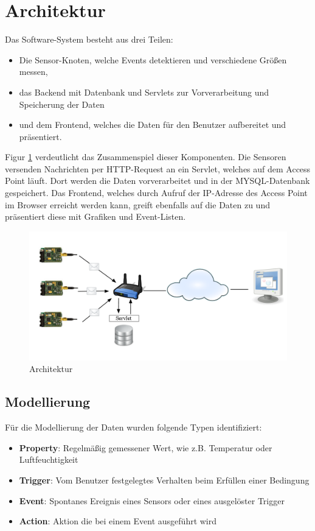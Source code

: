 \documentclass[12pt,a4paper,twoside]{article}
\newcommand{\labelSec}[1]{\label{sec:#1}}
\begin{document}
\section{Architektur}\labelSec{abschnitt}
Das Software-System besteht aus drei Teilen: 
\begin{itemize}
\item Die Sensor-Knoten, welche Events detektieren und verschiedene Größen messen,
\item das Backend mit Datenbank und Servlets zur Vorverarbeitung und Speicherung der Daten
\item und dem Frontend, welches die Daten für den Benutzer aufbereitet und präsentiert.
\end{itemize}
Figur \ref{architecture} verdeutlicht das Zusammenspiel dieser Komponenten. Die Sensoren versenden Nachrichten per HTTP-Request an ein Servlet, welches auf dem Access Point läuft. Dort werden die Daten vorverarbeitet und in der MYSQL-Datenbank gespeichert. Das Frontend, welches durch Aufruf der IP-Adresse des Access Point im Browser erreicht werden kann, greift ebenfalls auf die Daten zu und präsentiert diese mit Grafiken und Event-Listen. 

\begin{figure}[htbp]
   \centering
   \includegraphics[width=12cm]{fig/Architektur.png}
   \caption{Architektur}
   \label{architecture}
\end{figure}

\subsection{Modellierung}
Für die Modellierung der Daten wurden folgende Typen identifiziert: 
\begin{itemize}
\item 
\textbf{Property}: Regelmäßig gemessener Wert, wie z.B. Temperatur oder Luftfeuchtigkeit
\item 
\textbf{Trigger}: Vom Benutzer festgelegtes Verhalten beim
Erfüllen einer Bedingung
\item 
\textbf{Event}: Spontanes Ereignis eines Sensors oder eines ausgelöster Trigger
\item 
\textbf{Action}: Aktion die bei einem Event ausgeführt wird
\end{itemize}
\end{document}

